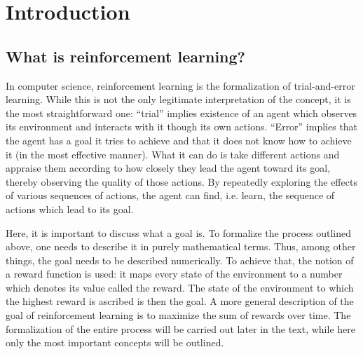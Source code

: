 \chapter{Introduction}
\label{ch-introduction}
\section{What is reinforcement learning?}
\label{sec-what-is-rl}
In computer science, reinforcement learning is the formalization of trial-and-error learning.
While this is not the only legitimate interpretation of the concept, it is the most straightforward one:
``trial'' implies existence of an agent which observes its environment and interacts with it 
though its own actions.
``Error'' implies that the agent has a goal it tries to achieve and
that it does not know how to achieve it (in the most effective manner). 
What it can do is take different actions and appraise them
according to how closely they lead the agent toward its goal, thereby observing
the quality of those actions.
By repeatedly exploring the effects of various sequences of actions, the agent
can find, i.e. learn, the sequence of actions which lead to its goal.

Here, it is important to discuss what a goal is.
To formalize the process outlined above, one needs to describe it
in purely mathematical terms.
Thus, among other things, the goal needs to be described numerically.
To achieve that, the notion of a reward function is used:
it maps every state of the environment to a number which denotes
its value called the reward. 
The state of the environment to which the highest reward is ascribed
is then the goal.
A more general description of the goal of reinforcement learning
is to maximize the sum of rewards over time.
The formalization of the entire process will be carried out later in the text,
while here only the most important concepts will be outlined.


